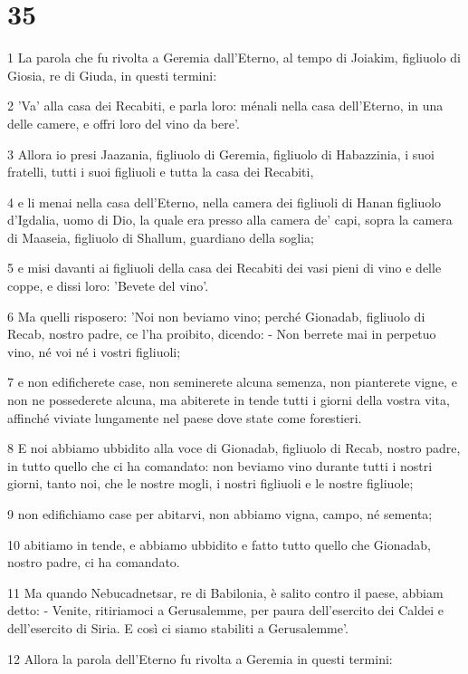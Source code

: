 \chapter{35}

\par 1 La parola che fu rivolta a Geremia dall'Eterno, al tempo di Joiakim, figliuolo di Giosia, re di Giuda, in questi termini:
\par 2 'Va' alla casa dei Recabiti, e parla loro: ménali nella casa dell'Eterno, in una delle camere, e offri loro del vino da bere'.
\par 3 Allora io presi Jaazania, figliuolo di Geremia, figliuolo di Habazzinia, i suoi fratelli, tutti i suoi figliuoli e tutta la casa dei Recabiti,
\par 4 e li menai nella casa dell'Eterno, nella camera dei figliuoli di Hanan figliuolo d'Igdalia, uomo di Dio, la quale era presso alla camera de' capi, sopra la camera di Maaseia, figliuolo di Shallum, guardiano della soglia;
\par 5 e misi davanti ai figliuoli della casa dei Recabiti dei vasi pieni di vino e delle coppe, e dissi loro: 'Bevete del vino'.
\par 6 Ma quelli risposero: 'Noi non beviamo vino; perché Gionadab, figliuolo di Recab, nostro padre, ce l'ha proibito, dicendo: - Non berrete mai in perpetuo vino, né voi né i vostri figliuoli;
\par 7 e non edificherete case, non seminerete alcuna semenza, non pianterete vigne, e non ne possederete alcuna, ma abiterete in tende tutti i giorni della vostra vita, affinché viviate lungamente nel paese dove state come forestieri.
\par 8 E noi abbiamo ubbidito alla voce di Gionadab, figliuolo di Recab, nostro padre, in tutto quello che ci ha comandato: non beviamo vino durante tutti i nostri giorni, tanto noi, che le nostre mogli, i nostri figliuoli e le nostre figliuole;
\par 9 non edifichiamo case per abitarvi, non abbiamo vigna, campo, né sementa;
\par 10 abitiamo in tende, e abbiamo ubbidito e fatto tutto quello che Gionadab, nostro padre, ci ha comandato.
\par 11 Ma quando Nebucadnetsar, re di Babilonia, è salito contro il paese, abbiam detto: - Venite, ritiriamoci a Gerusalemme, per paura dell'esercito dei Caldei e dell'esercito di Siria. E così ci siamo stabiliti a Gerusalemme'.
\par 12 Allora la parola dell'Eterno fu rivolta a Geremia in questi termini:
